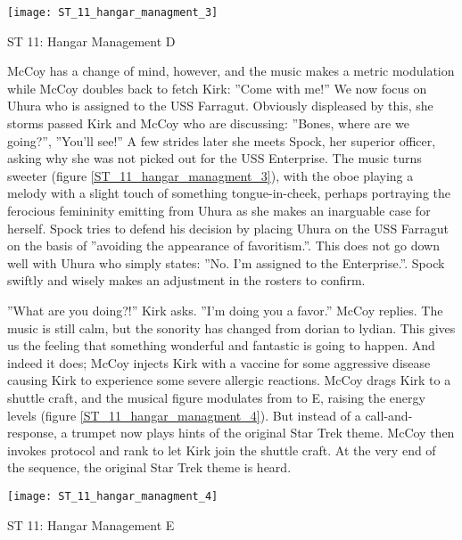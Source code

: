 \begin{marginfigure}
\center
\texttt{[image: ST\_11\_hangar\_managment\_3]}
	\caption{ST 11: Hangar Management D}
	\label{ST_11_hangar_managment_3}
\end{marginfigure}
McCoy has a change of mind, however, and the music makes a metric modulation while McCoy doubles back to fetch Kirk: ''Come with me!'' We now focus on Uhura who is assigned to the USS Farragut. Obviously displeased by this, she storms passed Kirk and McCoy who are discussing: ''Bones, where are we going?'', ''You'll see!'' A few strides later she meets Spock, her superior officer, asking why she was not picked out for the USS Enterprise. The music turns sweeter (figure \ref{ST_11_hangar_managment_3}), with the oboe playing a melody with a slight touch of something tongue-in-cheek, perhaps portraying the ferocious femininity emitting from Uhura as she makes an inarguable case for herself. Spock tries to defend his decision by placing Uhura on the USS Farragut on the basis of ''avoiding the appearance of favoritism.''. This does not go down well with Uhura who simply states: ''No. I'm assigned to the Enterprise.''. Spock swiftly and wisely makes an adjustment in the rosters to confirm.

''What are you doing?!'' Kirk asks. ''I'm doing you a favor.'' McCoy replies. The music is still calm, but the sonority has changed from dorian to lydian. This gives us the feeling that something wonderful and fantastic is going to happen. And indeed it does; McCoy injects Kirk with a vaccine for some aggressive disease causing Kirk to experience some severe allergic reactions. McCoy drags Kirk to a shuttle craft, and the musical figure modulates from \dflat to E, raising the energy levels (figure \ref{ST_11_hangar_managment_4}). But instead of a call-and-response, a trumpet now plays hints of the original Star Trek theme. McCoy then invokes protocol and rank to let Kirk join the shuttle craft. At the very end of the sequence, the original Star Trek theme is heard.

\begin{marginfigure}
\center
\texttt{[image: ST\_11\_hangar\_managment\_4]}
	\caption{ST 11: Hangar Management E}
	\label{ST_11_hangar_managment_4}
\end{marginfigure}

\clearpage


